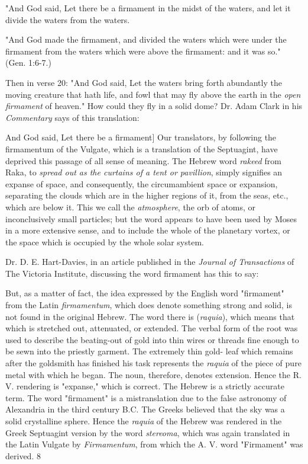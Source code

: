 "And God said, Let there be a firmament in the midst of the waters, and let it divide the
waters from the waters.

"And God made the firmament, and divided the waters which were under the firmament from
the waters which were above the firmament: and it was so." (Gen. 1:6-7.)

Then in verse 20: "And God said, Let the waters bring forth abundantly the moving creature
that hath life, and fowl that may fly above the earth in the \textit{open firmament} of heaven." How
could they fly in a solid dome? Dr. Adam Clark in his \textit{Commentary} says of this translation:

And God said, Let there be a firmament] Our translators, by following the firmamentum of
the Vulgate, which is a translation of the Septuagint, have deprived this passage of all sense
of meaning. The Hebrew word \textit{rakeed} from Raka, to \textit{spread out as the curtains of a tent or
pavillion}, simply signifies an expanse of space, and consequently, the circumambient space
or expansion, separating the clouds which are in the higher regions of it, from the seas, etc.,
which are below it. This we call the \textit{atmosphere}, the orb of atoms, or inconclusively small
particles; but the word appears to have been used by Moses in a more extensive sense, and to
include the whole of the planetary vortex, or the space which is occupied by the whole solar
system.

Dr. D. E. Hart-Davies, in an article published in the \textit{Journal of Transactions} of The Victoria
Institute, discussing the word firmament has this to say:

But, as a matter of fact, the idea expressed by the English word "firmament" from the Latin
\textit{firmamentum}, which does denote something strong and solid, is not found in the original
Hebrew. The word there is (\textit{raquia}), which means that which is stretched out, attenuated, or
extended. The verbal form of the root was used to describe the beating-out of gold into thin
wires or threads fine enough to be sewn into the priestly garment. The extremely thin gold-
leaf which remains after the goldsmith has finished his task represents the \textit{raquia} of the piece
of pure metal with which he began. The noun, therefore, denotes extension. Hence the R. V.
rendering is "expanse," which is correct. The Hebrew is a strictly accurate term. The word
"firmament" is a mistranslation due to the false astronomy of Alexandria in the third century
B.C. The Greeks believed that the sky was a solid crystalline sphere. Hence the \textit{raquia} of the
Hebrew was rendered in the Greek Septuagint version by the word \textit{stereoma}, which was
again translated in the Latin Vulgate by \textit{Firmamentum}, from which the A. V. word
"Firmament" was derived. 8

